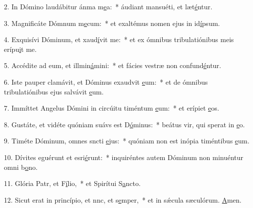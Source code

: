 2. In Dómino laudábitur ánma m\uline{e}a:~* áudiant mansuéti, et læt\uline{é}ntur.\par 
3. Magnificáte Dómnum m\uline{e}cum:~* et exaltémus nomen ejus in id\uline{í}psum.\par 
4. Exquisívi Dóminum, et xaud\uline{í}vit me:~* et ex ómnibus tribulatiónibus meis erípu\uline{i}t me.\par 
5. Accédite ad eum, et illmin\uline{á}mini:~* et fácies vestræ non confund\uline{é}ntur.\par 
6. Iste pauper clamávit, et Dóminus exaudvit \uline{e}um:~* et de ómnibus tribulatiónibus ejus salvávit \uline{e}um.\par 
7. Immíttet Angelus Dómini in circúitu timéntum \uline{e}um:~* et erípiet \uline{e}os.\par 
8. Gustáte, et vidéte quóniam suávs est D\uline{ó}minus:~* beátus vir, qui sperat in \uline{e}o.\par 
9. Timéte Dóminum, omnes sncti \uline{e}jus:~* quóniam non est inópia timéntibus \uline{e}um.\par 
10. Dívites eguérunt et esri\uline{é}runt:~* inquiréntes autem Dóminum non minuéntur omni b\uline{o}no.\par 
11. Glória Patr, et F\uline{í}lio,~* et Spirítui S\uline{a}ncto.\par 
12. Sicut erat in princípio, et nnc, et s\uline{e}mper,~* et in sǽcula sæculórum. \uline{A}men.\par 
